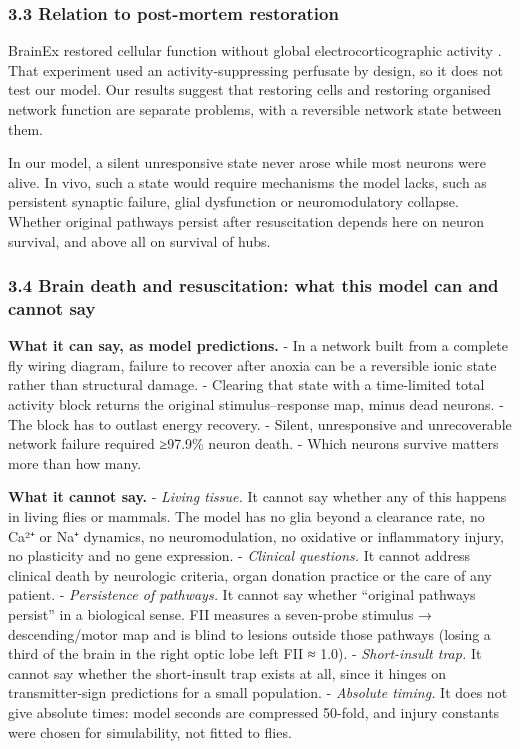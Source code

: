 \documentclass[11pt]{article}
\begin{document}
\subsubsection{3.3 Relation to post-mortem restoration}\label{relation-to-post-mortem-restoration}

BrainEx restored cellular function without global electrocorticographic activity \cite{vrselja2019}. That experiment used an activity-suppressing perfusate by design, so it does not test our model. Our results suggest that restoring cells and restoring organised network function are separate problems, with a reversible network state between them.

In our model, a silent unresponsive state never arose while most neurons were alive. In vivo, such a state would require mechanisms the model lacks, such as persistent synaptic failure, glial dysfunction or neuromodulatory collapse. Whether original pathways persist after resuscitation depends here on neuron survival, and above all on survival of hubs.

\subsubsection{3.4 Brain death and resuscitation: what this model can and cannot say}\label{brain-death-and-resuscitation-what-this-model-can-and-cannot-say}

\textbf{What it can say, as model predictions.}
- In a network built from a complete fly wiring diagram, failure to recover after anoxia can be a reversible ionic state rather than structural damage.
- Clearing that state with a time-limited total activity block returns the original stimulus--response map, minus dead neurons.
- The block has to outlast energy recovery.
- Silent, unresponsive and unrecoverable network failure required ≥97.9\% neuron death.
- Which neurons survive matters more than how many.

\textbf{What it cannot say.}
- \emph{Living tissue.} It cannot say whether any of this happens in living flies or mammals. The model has no glia beyond a clearance rate, no Ca²⁺ or Na⁺ dynamics, no neuromodulation, no oxidative or inflammatory injury, no plasticity and no gene expression.
- \emph{Clinical questions.} It cannot address clinical death by neurologic criteria, organ donation practice or the care of any patient.
- \emph{Persistence of pathways.} It cannot say whether ``original pathways persist'' in a biological sense. FII measures a seven-probe stimulus → descending/motor map and is blind to lesions outside those pathways (losing a third of the brain in the right optic lobe left FII ≈ 1.0).
- \emph{Short-insult trap.} It cannot say whether the short-insult trap exists at all, since it hinges on transmitter-sign predictions for a small population.
- \emph{Absolute timing.} It does not give absolute times: model seconds are compressed 50-fold, and injury constants were chosen for simulability, not fitted to flies.
\end{document}
